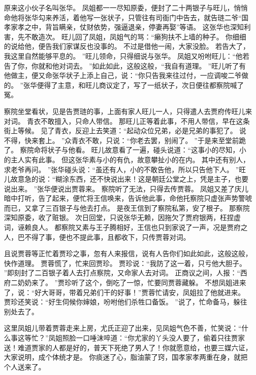 原来这小伙子名叫张华。
凤姐都一一尽知原委，便封了二十两银子与旺儿，悄悄命他将张华勾来养活，着他写一张状子，只管往有司衙门中告去，就告琏二爷“国孝家孝之中，背旨瞒亲，仗财依势，强逼退亲，停妻再娶”等语。
这张华也深知利害，先不敢造次。
旺儿回了凤姐，凤姐气的骂：“癞狗扶不上墙的种子。
你细细的说给他，便告我们家谋反也没事的。
不过是借他一闹，大家没脸。
若告大了，我这里自然能够平息的。
”旺儿领命，只得细说与张华。
凤姐又吩咐旺儿：“他若告了你，你就和他对词去。
”如此如此，这般这般，“我自有道理。
”旺儿听了有他做主，便又命张华状子上添上自己，说：“你只告我来往过付，一应调唆二爷做的。
”张华便得了主意，和旺儿商议定了，写了一纸状子，次日便往都察院喊了冤。
\par
察院坐堂看状，见是告贾琏的事，上面有家人旺儿一人，只得遣人去贾府传旺儿来对词。
青衣不敢擅入，只命人带信。
那旺儿正等着此事，不用人带信，早在这条街上等候。
见了青衣，反迎上去笑道：“起动众位兄弟，必是兄弟的事犯了。
说不得，快来套上。
”众青衣不敢，只说：“你老去罢，别闹了。
”于是来至堂前跪了。
察院命将状子与他看。
旺儿故意看了一遍，碰头说道：“这事小的尽知，小的主人实有此事。
但这张华素与小的有仇，故意攀扯小的在内。
其中还有别人，求老爷再问。
”张华碰头说：“虽还有人，小的不敢告他，所以只告他下人。
”旺儿故意急的说：“糊涂东西，还不快说出来！这是朝廷公堂之上，凭是主子，也要说出来。
”张华便说出贾蓉来。
察院听了无法，只得去传贾蓉。
凤姐又差了庆儿暗中打听，告了起来，便忙将王信唤来，告诉他此事，命他托察院只虚张声势警唬而已，又拿了三百银子与他去打点。
是夜王信到了察院私第，安了根子。
那察院深知原委，收了赃银。
次日回堂，只说张华无赖，因拖欠了贾府银两，枉捏虚词，诬赖良人。
都察院又素与王子腾相好，王信也只到家说了一声，况是贾府之人，巴不得了事，便也不提此事，且都收下，只传贾蓉对词。
\par
且说贾蓉等正忙着贾珍之事，忽有人来报信，说有人告你们如此如此，这般这般，快作道理。
贾蓉慌了，忙来回贾珍。
贾珍说：“我防了这一着，只亏他大胆子。
”即刻封了二百银子着人去打点察院，又命家人去对词。
正商议之间，人报：“西府二奶奶来了。
”贾珍听了这个，倒吃了一惊，忙要同贾蓉藏躲。
不想凤姐进来了，说：“好大哥哥，带着兄弟们干的好事！”贾蓉忙请安，凤姐拉了他就进来。
贾珍还笑说：“好生伺候你婶娘，吩咐他们杀牲口备饭。
”说了，忙命备马，躲往别处去了。
\par
这里凤姐儿带着贾蓉走来上房，尤氏正迎了出来，见凤姐气色不善，忙笑说：“什么事这等忙？”凤姐照脸一口唾沫啐道：“你尤家的丫头没人要了，偷着只往贾家送！难道贾家的人都是好的，普天下死绝了男人了！你就愿意给，也要三媒六证，大家说明，成个体统才是。
你痰迷了心，脂油蒙了窍，国孝家孝两重在身，就把个人送来了。
